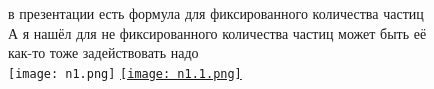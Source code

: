 \documentclass[14pt]{extreport}
\begin{document}
\begin{figure}[h!]
  в презентации есть формула для фиксированного количества частиц А я нашёл для не фиксированного количества частиц может быть её как-то тоже задействовать надо\\
\texttt{[image: n1.png]}
\href{https://ru.wikipedia.org/wiki/%D0%AD%D0%BD%D0%B5%D1%80%D0%B3%D0%B8%D1%8F_%D0%93%D0%B8%D0%B1%D0%B1%D1%81%D0%B0}{\texttt{[image: n1.1.png]}}
\end{figure}

      

    
\end{document}
